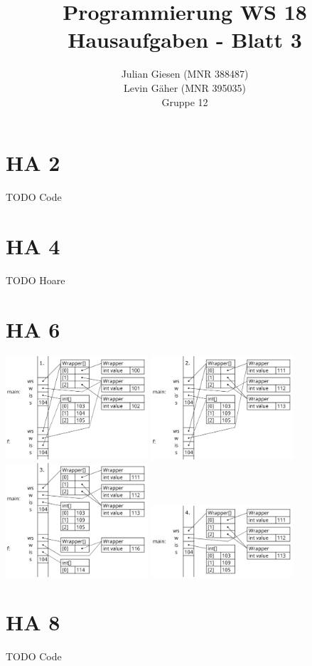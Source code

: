 \documentclass[a4paper]{article}
\title{ Programmierung WS 18 \\ Hausaufgaben - Blatt 3 }
\author{ Julian Giesen (MNR 388487) \\
Levin Gäher (MNR 395035) \\
Gruppe 12 }
\date{  }
\begin{document}
\maketitle

\section*{ HA 2 }

TODO Code

\section*{ HA 4 }

TODO Hoare

\section*{ HA 6 }

	\includegraphics*[width=200px]{ProgramData_1.png} 
	\includegraphics*[width=200px]{ProgramData_2.png} 
	\includegraphics*[width=200px]{ProgramData_3.png} 
	\includegraphics*[width=200px]{ProgramData_4.png} 

\section*{ HA 8 }

TODO Code
\end{document}
